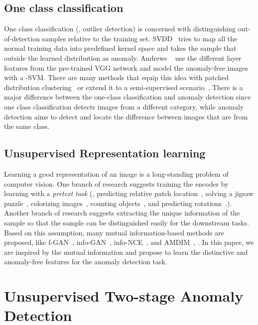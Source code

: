 \documentclass[final]{cvpr}
\begin{document}
\subsection{One class classification}
One class classification (\ie, outlier detection) is concerned with distinguishing out-of-detection samples relative to the training set. 
SVDD~\cite{A:tax2004support} tries to map all the normal training data into predefined kernel space and takes the sample that outside the learned distribution as anomaly.
Andrews \etal~\cite{A:andrews2016transfer} use the different layer features from the pre-trained VGG network and model the anomaly-free images with a -SVM.  
There are many methods that equip this idea with patched distribution clustering~\cite{A:napoletano2018anomaly} or extend it to a semi-supervised scenario~\cite{A:ruff2020deep}.
There is a major difference between the one-class classification and anomaly detection since one class classification detects images from a different category, while anomaly detection aims to detect and locate the difference between images that are from the same class. 


\subsection{Unsupervised Representation learning}
Learning a good representation of an image is a long-standing problem of computer vision. 
One branch of research suggests training the encoder by learning with
a \textit{pretext task} (\eg, predicting relative patch location~\cite{R:doersch2015context_prediction}, solving a jigsaw puzzle~\cite{R:noroozi2016jigsaw}, colorizing images~\cite{R:zhang2016colorization}, counting objects~\cite{R:noroozi2017count}, and predicting rotations~\cite{R:gidaris2018rotations}.). 
Another branch of research suggests extracting the unique information of the sample so that the sample can be distinguished easily for the downstream tasks. Based on this assumption, many mutual information-based methods are proposed, like f-GAN~\cite{R:nowozin2016fGAN}, info-GAN~\cite{R:chen2016infogan}, info-NCE~\cite{R:tschannen2020mutual_InfoNCE}, and AMDIM~\cite{R:bachman2019learning_AMDIM}, \etc. In this paper, we are inspired by the mutual information and propose to learn the distinctive and anomaly-free features for the anomaly detection task.


\section{Unsupervised Two-stage Anomaly Detection}
\end{document}
